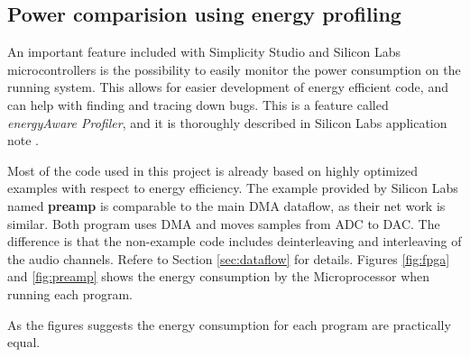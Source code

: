 \subsection{Power comparision using energy profiling}

An important feature included with Simplicity Studio and Silicon Labs microcontrollers
is the possibility to easily monitor the power consumption on the running system.
This allows for easier development of energy efficient code, and can help
with finding and tracing down bugs.
This is a feature called \textit{energyAware Profiler}, and it is thoroughly
described in Silicon Labs application note \cite{energydbg}.

Most of the code used in this project is already based on highly optimized
examples with respect to energy efficiency.
The example provided by Silicon Labs named {\bf preamp} is comparable to the main
DMA dataflow, as their net work is similar. Both program uses DMA and moves samples
from ADC to DAC. The difference is that the non-example code includes deinterleaving
and interleaving of the audio channels. Refere to Section \ref{sec:dataflow}
for details. Figures \ref{fig:fpga} and \ref{fig:preamp}
shows the energy consumption by the Microprocessor when running each program.





As the figures suggests the energy consumption for each program are practically equal.
